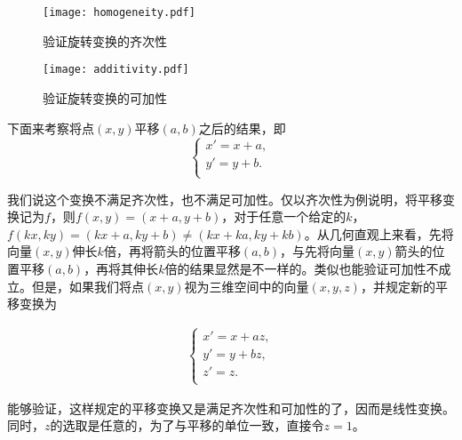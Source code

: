 \begin{figure}[h]
    \centering
    \texttt{[image: homogeneity.pdf]}
    \caption{验证旋转变换的齐次性}
\end{figure}


\begin{figure}[h]
    \centering
    \texttt{[image: additivity.pdf]}
    \caption{验证旋转变换的可加性}
\end{figure}


下面来考察将点$(x,y)$平移$(a,b)$之后的结果，即
\[
    \begin{cases}
        x'=x+a, \\
        y'=y+b. \\
    \end{cases}
    \]







我们说这个变换不满足齐次性，也不满足可加性。仅以齐次性为例说明，将平移变换记为$f$，则$f(x,y)=(x+a,y+b)$，对于任意一个给定的$k$，$f(kx,ky)=(kx+a,ky+b)\ne (kx+ka,ky+kb)$。从几何直观上来看，先将向量$(x,y)$伸长$k$倍，再将箭头的位置平移$(a,b)$，与先将向量$(x,y)$箭头的位置平移$(a,b)$，再将其伸长$k$倍的结果显然是不一样的。类似也能验证可加性不成立。但是，如果我们将点$(x,y)$视为三维空间中的向量$(x,y,z)$，并规定新的平移变换为

\begin{align*}
    \begin{cases}
        x'=x+az, \\
        y'=y+bz, \\
        z'=z .   \\
    \end{cases}
\end{align*}

能够验证，这样规定的平移变换又是满足齐次性和可加性的了，因而是线性变换。同时，$z$的选取是任意的，为了与平移的单位一致，直接令$z=1$。

